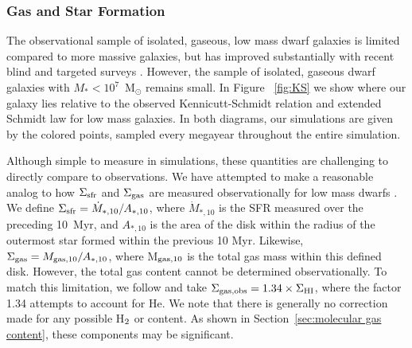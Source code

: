 \documentclass[twocolumn]{aastex61}
\begin{document}
\subsubsection{Gas and Star Formation}
\label{sec:gas_sf}

The observational sample of isolated, gaseous, low mass dwarf galaxies is limited compared to more massive galaxies, but has improved substantially with recent blind and targeted  surveys \citep[e.g.][]{Giovanelli2005, Geha2006, Geha2012, Walter2008, Cannon2011, Haynes2011, Hunter2012, Bradford2015, James2015, Tollerud2015, Sand2015, Wang2017}. However, the sample of isolated, gaseous dwarf galaxies with $M_{*} < 10^{7}$~M$_{\odot}$ remains small. In Figure ~\ref{fig:KS} we show where our galaxy lies relative to the observed Kennicutt-Schmidt relation and extended Schmidt law for low mass galaxies. In both diagrams, our simulations are given by the colored points, sampled every megayear throughout the entire simulation. 

Although simple to measure in simulations, these quantities are challenging to directly compare to observations. We have attempted to make a reasonable analog to how $\Sigma_{\rm sfr}$ and $\Sigma_{\rm gas}$ are measured observationally for low mass dwarfs \citet[see ][]{Roychowdhury2014}. We define $\Sigma_{\rm sfr} = \dot{M}_{*,10} / A_{*,10}$, where $\dot{M}_{*,10}$ is the SFR measured over the preceding 10~Myr, and $A_{*,10}$ is the area of the disk within the radius of the outermost star formed within the previous 10 Myr. Likewise, $\Sigma_{\rm gas} = M_{\rm gas,10} / A_{*,10}$, where M$_{\rm gas,10}$ is the total gas mass within this defined disk. However, the total gas content cannot be determined observationally. To match this limitation, we follow \cite{Roychowdhury2014} and take $\Sigma_{\rm gas, obs} = 1.34 \times \Sigma_{\rm HI}$, where the factor 1.34 attempts to account for He. We note that there is generally no correction made for any possible H$_{\rm 2}$ or  content. As shown in Section~\ref{sec:molecular gas content}, these components may be significant.
\end{document}
